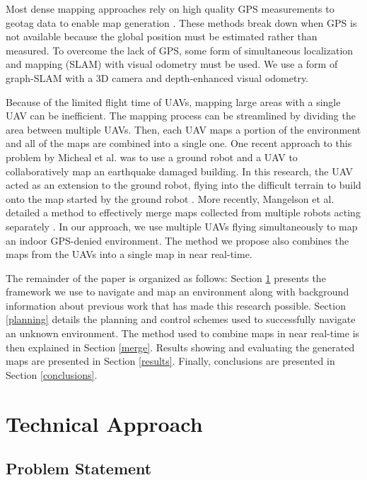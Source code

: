 \documentclass[letterpaper, 10 pt, conference]{ieeeconf}  %
\begin{document}
Most dense mapping approaches rely on high quality GPS measurements to geotag data to enable map generation \cite{Siebert2014, Martin2015}. These methods break down when GPS is not available because the global position must be estimated rather than measured. To overcome the lack of GPS, some form of simultaneous localization and mapping (SLAM) with visual odometry must be used. We use a form of graph-SLAM with a 3D camera and depth-enhanced visual odometry.

Because of the limited flight time of UAVs, mapping large areas with a single UAV can be inefficient. The mapping process can be streamlined by dividing the area between multiple UAVs. Then, each UAV maps a portion of the environment and all of the maps are combined into a single one. One recent approach to this problem by Micheal et al. was to use a ground robot and a UAV to collaboratively map an earthquake damaged building. In this research, the UAV acted as an extension to the ground robot, flying into the difficult terrain to build onto the map started by the ground robot \cite{Michael2012}. More recently, Mangelson et al. detailed a method to effectively merge maps collected from multiple robots acting separately \cite{Mangelson2018}. In our approach, we use multiple UAVs flying simultaneously to map an indoor GPS-denied environment. The method we propose also combines the maps from the UAVs into a single map in near real-time.

The remainder of the paper is organized as follows: Section \ref{approach} presents the framework we use to navigate and map an environment along with background information about previous work that has made this research possible. Section \ref{planning} details the planning and control schemes used to successfully navigate an unknown environment. The method used to combine maps in near real-time is then explained in Section \ref{merge}. Results showing and evaluating the generated maps are presented in Section \ref{results}. Finally, conclusions are presented in Section \ref{conclusions}.

\section{Technical Approach}\label{approach}

\subsection{Problem Statement}
\end{document}
